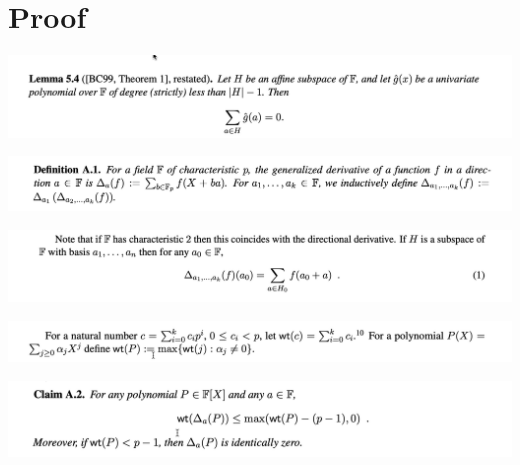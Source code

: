 \documentclass{beamer}
\begin{document}
\section{Proof}

\begin{frame}{}
	\begin{minipage}{0.42\linewidth}
		\includegraphics[scale=0.25]{p2.png}
	\end{minipage}
\end{frame}

\begin{frame}{}
	\begin{minipage}{0.42\linewidth}
		\includegraphics[scale=0.25]{p1.png}
	\end{minipage}
\end{frame}


\begin{frame}{}
	\begin{minipage}{0.42\linewidth}
		\includegraphics[scale=0.25]{p3.png}
	\end{minipage}
\end{frame}

\begin{frame}{}
	\begin{minipage}{0.42\linewidth}
		\includegraphics[scale=0.25]{p4.png}
	\end{minipage}
\end{frame}


\begin{frame}{}
	\begin{minipage}{0.42\linewidth}
		\includegraphics[scale=0.25]{p5.png}
	\end{minipage}
\end{frame}
\end{document}
